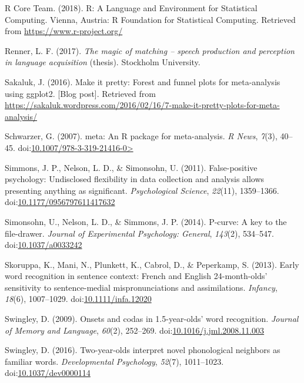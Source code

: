 \documentclass[man, noextraspace]{apa6}
\begin{document}
\leavevmode\hypertarget{ref-R}{}%
R Core Team. (2018). R: A Language and Environment for Statistical Computing. Vienna, Austria: R Foundation for Statistical Computing. Retrieved from \url{https://www.r-project.org/}

\leavevmode\hypertarget{ref-Renner2017}{}%
Renner, L. F. (2017). \emph{The magic of matching -- speech production and perception in language acquisition} (thesis). Stockholm University.

\leavevmode\hypertarget{ref-Sakaluk2016}{}%
Sakaluk, J. (2016). Make it pretty: Forest and funnel plots for meta-analysis using ggplot2. {[}Blog post{]}. Retrieved from \url{https://sakaluk.wordpress.com/2016/02/16/7-make-it-pretty-plots-for-meta-analysis/}

\leavevmode\hypertarget{ref-meta}{}%
Schwarzer, G. (2007). meta: An R package for meta-analysis. \emph{R News}, \emph{7}(3), 40--45. doi:\href{https://doi.org/10.1007/978-3-319-21416-0\%3E}{10.1007/978-3-319-21416-0\textgreater{}}

\leavevmode\hypertarget{ref-Simmons2011}{}%
Simmons, J. P., Nelson, L. D., \& Simonsohn, U. (2011). False-positive psychology: Undisclosed flexibility in data collection and analysis allows presenting anything as significant. \emph{Psychological Science}, \emph{22}(11), 1359--1366. doi:\href{https://doi.org/10.1177/0956797611417632}{10.1177/0956797611417632}

\leavevmode\hypertarget{ref-pcurve}{}%
Simonsohn, U., Nelson, L. D., \& Simmons, J. P. (2014). P-curve: A key to the file-drawer. \emph{Journal of Experimental Psychology: General}, \emph{143}(2), 534--547. doi:\href{https://doi.org/10.1037/a0033242}{10.1037/a0033242}

\leavevmode\hypertarget{ref-Skoruppa2013}{}%
Skoruppa, K., Mani, N., Plunkett, K., Cabrol, D., \& Peperkamp, S. (2013). Early word recognition in sentence context: French and English 24-month-olds' sensitivity to sentence-medial mispronunciations and assimilations. \emph{Infancy}, \emph{18}(6), 1007--1029. doi:\href{https://doi.org/10.1111/infa.12020}{10.1111/infa.12020}

\leavevmode\hypertarget{ref-Swingley2009}{}%
Swingley, D. (2009). Onsets and codas in 1.5-year-olds' word recognition. \emph{Journal of Memory and Language}, \emph{60}(2), 252--269. doi:\href{https://doi.org/10.1016/j.jml.2008.11.003}{10.1016/j.jml.2008.11.003}

\leavevmode\hypertarget{ref-Swingley2016}{}%
Swingley, D. (2016). Two-year-olds interpret novel phonological neighbors as familiar words. \emph{Developmental Psychology}, \emph{52}(7), 1011--1023. doi:\href{https://doi.org/10.1037/dev0000114}{10.1037/dev0000114}
\end{document}
